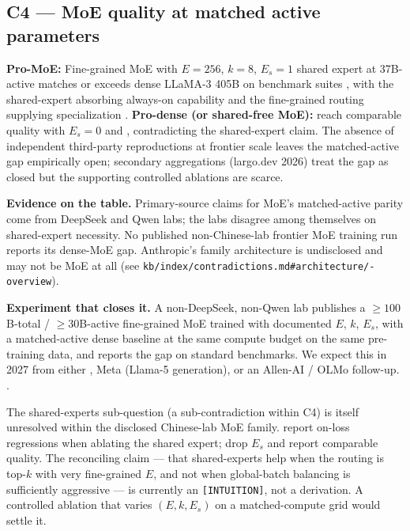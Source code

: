 \subsection{C4 --- MoE quality at matched active parameters}
\label{sec:c-moe}

\textbf{Pro-MoE:} Fine-grained MoE with $E = 256$, $k = 8$, $E_s = 1$
shared expert at 37B-active matches or exceeds dense LLaMA-3 405B on
benchmark suites \citep[abstract]{deepseek-v3}, with the shared-expert
absorbing always-on capability and the fine-grained routing supplying
specialization \citep{deepseekmoe2024}. \textbf{Pro-dense (or
shared-free MoE):} \citet{qwen3} reach comparable quality with $E_s =
0$ and , contradicting the shared-expert
claim. The absence of independent third-party reproductions at
frontier scale leaves the matched-active gap empirically open;
secondary aggregations (largo.dev 2026) treat the gap as closed but
the supporting controlled ablations are scarce.

\textbf{Evidence on the table.} Primary-source claims for MoE's
matched-active parity come from DeepSeek and Qwen labs; the labs
disagree among themselves on shared-expert necessity. No published
non-Chinese-lab frontier MoE training run reports its dense-MoE gap.
Anthropic's  family architecture is undisclosed and may not be
MoE at all
(see \texttt{kb/index/contradictions.md\#architecture/-overview}).

\textbf{Experiment that closes it.} A non-DeepSeek, non-Qwen lab
publishes a $\geq 100$B-total / $\geq 30$B-active fine-grained MoE
trained with documented $E$, $k$, $E_s$, with a matched-active dense
baseline at the same compute budget on the same pre-training data, and
reports the gap on standard benchmarks. We expect this in 2027 from
either , Meta (Llama-5 generation), or an Allen-AI / OLMo
follow-up.
.

\begin{contradiction}
The shared-experts sub-question (a sub-contradiction within C4) is
itself unresolved within the disclosed Chinese-lab MoE family.
\citet{deepseek-v3} report on-loss regressions when ablating the shared
expert; \citet{qwen3} drop $E_s$ and report comparable quality. The
reconciling claim --- that shared-experts help when the routing is
top-$k$ with very fine-grained $E$, and not when global-batch balancing
is sufficiently aggressive --- is currently an
\texttt{[INTUITION]}, not a derivation. A controlled ablation that
varies $(E, k, E_s)$ on a matched-compute grid would settle it.
\end{contradiction}

